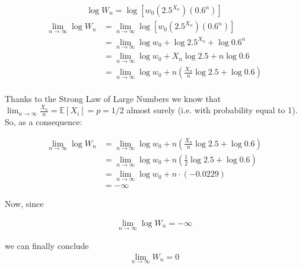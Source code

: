 \documentclass[12pt]{article}
\begin{document}
\begin{align}
    \begin{equation*}
        \log{W_n} = \log{\left[w_0 \left(2.5^{X_n}\right) \left(0.6^{n}\right)\right]}
  \end{equation*}    
\end{align}
\begin{equation*}
  \begin{split}
     \lim_{n\to\infty} \log{W_n} &= \lim_{n\to\infty} \log{\left[w_0 \left(2.5^{X_n}\right) \left(0.6^{n}\right)\right]}\\
    &= \lim_{n\to\infty} \log{w_0} + \log{2.5^{X_n}} + \log{0.6^{n}}\\
    &= \lim_{n\to\infty} \log{w_0} + X_n \log{2.5} + n \log{0.6}\\
    &= \lim_{n\to\infty} \log{w_0} + n (\tfrac{X_n}{n} \log{2.5} + \log{0.6})\\
  \end{split}
\end{equation*}

Thanks to the Strong Law of Large Numbers we know that $\lim_{n\to\infty}{\tfrac{X_n}{n} = \mathbb{E}[X_i] = p = 1/2}$ almost surely (i.e. with probability equal to 1). So, as a consequence:

\begin{equation*}
  \begin{split}
      \lim_{n\to\infty} \log{W_n} &= \lim_{n\to\infty} \log{w_0} + n (\tfrac{X_n}{n} \log{2.5} + \log{0.6}) \\
      &= \lim_{n\to\infty} \log{w_0} + n (\tfrac{1}{2} \log{2.5} + \log{0.6}) \\
      &= \lim_{n\to\infty} \log{w_0} + n \cdot(-0.0229) \\
      &= -\infty
  \end{split}
\end{equation*}

Now, since

\begin{align*}
    \begin{equation*}
        \lim_{n\to\infty} \log{W_n} = -\infty
    \end{equation*}    
\end{align*}

we can finally conclude
\begin{align}
    \begin{equation*}
        \lim_{n\to\infty} {W_n} = 0
    \end{equation*}    
\end{align}
\end{document}
